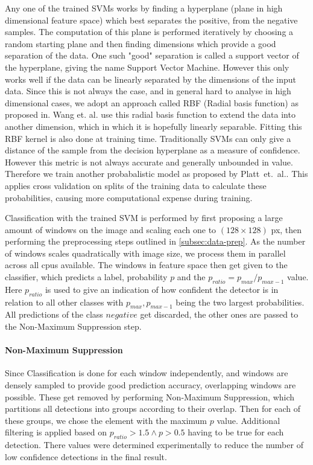 \documentclass[11pt]{article}
\begin{document}
Any one of the trained SVMs works by finding a hyperplane (plane in high dimensional feature space) which best separates the positive, from the negative samples.
The computation of this plane is performed iteratively by choosing a random starting plane and then finding dimensions which provide a good separation of the data. 
One such "good" separation is called a support vector of the hyperplane, giving the name Support Vector Machine. 
However this only works well if the data can be linearly separated by the dimensions of the input data. 
Since this is not always the case, and in general hard to analyse in high dimensional cases, we adopt an approach called RBF (Radial basis function) as proposed in\cite{10.1007/978-3-540-28647-9_85}.
Wang et. al. use this radial basis function to extend the data into another dimension, which in which it is hopefully linearly separable. Fitting this RBF kernel is also done at training time.
Traditionally SVMs can only give a distance of the sample from the decision hyperplane as a measure of confidence. 
However this metric is not always accurate and generally unbounded in value. Therefore we train another probabalistic model as proposed by Platt\ et.\ al.\cite{Platt99probabilisticoutputs}.
This applies cross validation on splits of the training data to calculate these probabilities, causing more computational expense during training.

Classification with the trained SVM is performed by first proposing a large amount of windows on the image and scaling each one to 
\( (128 \times 128) \) px, then performing the preprocessing steps outlined in \autoref{subsec:data-prep}. As the number of windows scales quadratically 
with image size, we process them in parallel across all cpus available. The windows in feature space then get given to the classifier, which predicts a label, probability \( p \) and the
\( p_{ratio} = p_{max} / p_{max - 1} \) value. Here \( p_{ratio} \) is used to give an indication of how confident the detector is in relation to all other classes with \( p_{max}, p_{max-1} \) being the two largest probabilities.
All predictions of the class \( negative \) get discarded, the other ones are passed to the Non-Maximum Suppression step.


\paragraph{Non-Maximum Suppression}
Since Classification is done for each window independently, and windows are densely sampled to provide good prediction accuracy, 
overlapping windows are possible. These get removed by performing Non-Maximum Suppression, which partitions all detections into groups according to their overlap.
Then for each of these groups, we chose the element with the maximum \( p \) value. Additional filtering is applied based on \( p_{ratio} > 1.5 \wedge p > 0.5 \) having to be true for each detection.
There values were determined experimentally to reduce the number of low confidence detections in the final result.
\end{document}
